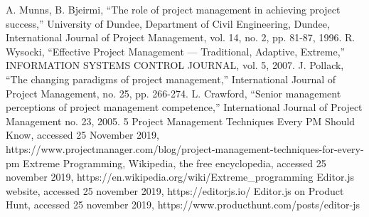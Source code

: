 \documentclass[conference]{IEEEtran}
\begin{document}
    \begin{thebibliography}{00}
         A. Munns, B. Bjeirmi, ``The role of project management in achieving project success,'' University of Dundee, Department of Civil Engineering, Dundee, International Journal of Project Management, vol. 14, no. 2, pp. 81-87, 1996.
          R. Wysocki, ``Effective Project Management — Traditional, Adaptive, Extreme,'' INFORMATION SYSTEMS CONTROL JOURNAL, vol. 5, 2007.
         J. Pollack, ``The changing paradigms of project management,'' International Journal of Project Management, no. 25, pp. 266-274.
         L. Crawford, ``Senior management perceptions of project management competence,'' International Journal of Project Management no. 23, 2005.
         5 Project Management Techniques Every PM Should Know, accessed 25 November 2019, https://www.projectmanager.com/blog/project-management-techniques-for-every-pm
         Extreme Programming, Wikipedia, the free encyclopedia, accessed 25 november 2019, https://en.wikipedia.org/wiki/Extreme\_programming
         Editor.js website, accessed 25 november 2019, https://editorjs.io/
         Editor.js on Product Hunt, accessed 25 november 2019, https://www.producthunt.com/posts/editor-js
    \end{thebibliography}
\end{document}
